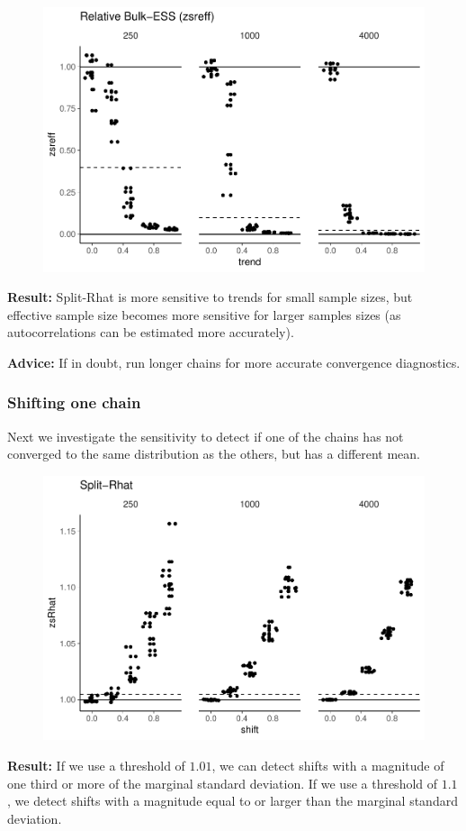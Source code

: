 \documentclass[american,]{article}
\begin{document}
\begin{figure}[tp]
  \centering
  \includegraphics[width=0.6\linewidth]{graphics/zsreff-same-trend-1.pdf}
\end{figure}

\textbf{Result:} Split-Rhat is more sensitive to trends for small sample
sizes, but effective sample size becomes more sensitive for larger
samples sizes (as autocorrelations can be estimated more accurately).

\textbf{Advice:} If in doubt, run longer chains for more accurate
convergence diagnostics.

\hypertarget{shifting-one-chain}{%
\subsubsection*{Shifting one chain}\label{shifting-one-chain}}

Next we investigate the sensitivity to detect if one of the chains has
not converged to the same distribution as the others, but has a
different mean.

\begin{figure}[tp]
  \centering
  \includegraphics[width=0.6\linewidth]{graphics/zsrhat-shifted-chain-1.pdf}
\end{figure}

\textbf{Result:} If we use a threshold of \(1.01\), we can detect shifts
with a magnitude of one third or more of the marginal standard
deviation. If we use a threshold of \(1.1\), we detect shifts with a
magnitude equal to or larger than the marginal standard deviation.
\end{document}
